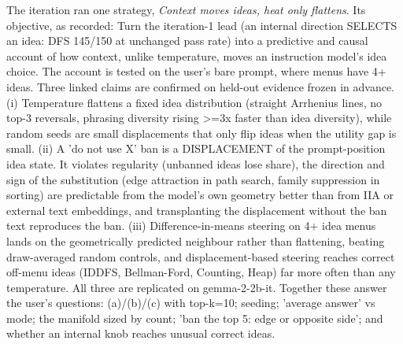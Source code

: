 \documentclass[11pt,letterpaper]{article}
\begin{document}
The iteration ran one strategy, \emph{Context moves ideas, heat only flattens}. Its objective, as recorded: Turn the iteration-1 lead (an internal direction SELECTS an idea: DFS 145/150 at unchanged pass rate) into a predictive and causal account of how context, unlike temperature, moves an instruction model's idea choice. The account is tested on the user's bare prompt, where menus have 4+ ideas. Three linked claims are confirmed on held-out evidence frozen in advance. (i) Temperature flattens a fixed idea distribution (straight Arrhenius lines, no top-3 reversals, phrasing diversity rising \textgreater{}=3x faster than idea diversity), while random seeds are small displacements that only flip ideas when the utility gap is small. (ii) A 'do not use X' ban is a DISPLACEMENT of the prompt-position idea state. It violates regularity (unbanned ideas lose share), the direction and sign of the substitution (edge attraction in path search, family suppression in sorting) are predictable from the model's own geometry better than from IIA or external text embeddings, and transplanting the displacement without the ban text reproduces the ban. (iii) Difference-in-means steering on 4+ idea menus lands on the geometrically predicted neighbour rather than flattening, beating draw-averaged random controls, and displacement-based steering reaches correct off-menu ideas (IDDFS, Bellman-Ford, Counting, Heap) far more often than any temperature. All three are replicated on gemma-2-2b-it. Together these answer the user's questions: (a)/(b)/(c) with top-k=10; seeding; 'average answer' vs mode; the manifold sized by count; 'ban the top 5: edge or opposite side'; and whether an internal knob reaches unusual correct ideas.
\end{document}

